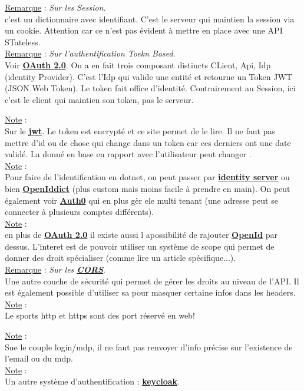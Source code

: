 \documentclass[a4paper,12pt,twoside]{article}
\newcommand{\urlcolor}{magenta}  %
\newcommand{\keycolor}{purple} %
\newcommand{\rem}[2]{\noindent\underline{Remarque} : \textit{#1}.\\ \indent #2}
\newcommand{\note}[1]{\noindent\underline{Note} : \\ \indent #1}
\newcommand{\keyref}[2]{\hypersetup{urlcolor=\keycolor} \href{#1}{\textbf{#2}}\hypersetup{urlcolor=\urlcolor}}
\begin{document}
\rem{Sur les Session}{c'est un dictionnaire avec identifiant. C'est le serveur qui maintien la session via un cookie. Attention car ce n'est pas évident à mettre en place avec une API STateless.}\\

\rem{Sur l'authentification Toekn Based}{Voir \keyref{https://oauth.net/2/}{OAuth 2.0}. On a en fait trois composant distincts CLient, Api, Idp (identity Provider). C'est l'Idp qui valide une entité et retourne un Token JWT (JSON Web Token). Le token fait office d'identité. Contrairement au Session, ici c'est le client qui maintien son token, pas le serveur.}

\note{Sur le \keyref{https://jwt.io/}{jwt}. Le token est encrypté et ce site permet de le lire. Il ne faut pas mettre d'id ou de chose qui change dans un token car ces derniers ont une date validé. La donné en base en rapport avec l'utilisateur peut changer .}\\

\note{Pour faire de l'identification en dotnet, on peut passer par \keyref{https://docs.microsoft.com/fr-fr/dotnet/architecture/cloud-native/identity-server}{identity server} ou bien \keyref{https://github.com/openiddict/openiddict-core}{OpenIddict} (plus custom mais moins facile à prendre en main). On peut également voir \keyref{https://auth0.com/fr}{Auth0} qui en plus gèr ele multi tenant (une adresse peut se connecter à plusieurs comptes différents).}\\

\note{en plus de \keyref{https://oauth.net/2/}{OAuth 2.0} il existe aussi l apossibilité de rajouter \keyref{https://openid.net/connect/}{OpenId} par dessus. L'interet est de pouvoir utiliser un système de scope qui permet de donner des droit spécialiser (comme lire un article spécifique...).}\\

\rem{Sur les \keyref{https://developer.mozilla.org/fr/docs/Web/HTTP/CORS}{CORS}}{Une autre couche de sécurité qui permet de gérer les droits au niveau de l'API. Il est également possible d'utiliser sa pour masquer certaine infos dans les headers.}\\

\note{Le sports http et https sont des port réservé en web!}

\note{Sue le couple login/mdp, il ne faut pas renvoyer d'info précise sur l'existence de l'email ou du mdp.}\\

\note{Un autre système d'authentification : \keyref{https://www.keycloak.org/}{keycloak}.}\\
\end{document}
